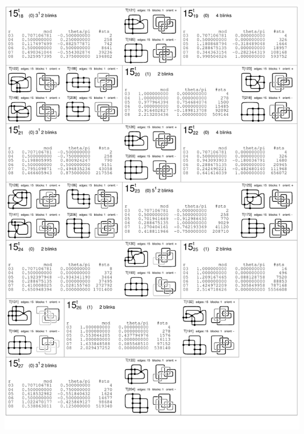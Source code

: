 \begin{center}
 \includegraphics[height=23.5cm]{E.figsbw2/con3catalog009_bw.pdf} \eject

\end{center}
